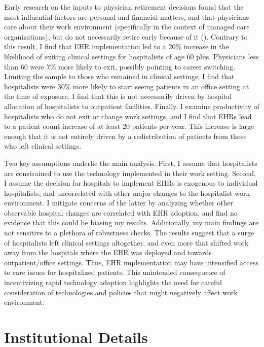 \documentclass[12pt]{article}
\begin{document}
Early research on the inputs to physician retirement decisions found that the most influential factors are personal and financial matters, and that physicians care about their work environment (specifically in the context of managed care organizations), but do not necessarily retire early because of it (\cite{Bahrami2002}). Contrary to this result, I find that EHR implementation led to a 20\% increase in the likelihood of exiting clinical settings for hospitalists of age 60 plus. Physicians less than 60 were 7\% more likely to exit, possibly pointing to career switching. Limiting the sample to those who remained in clinical settings, I find that hospitalists were 30\% more likely to start seeing patients in an office setting at the time of exposure. I find that this is not necessarily driven by hospital allocation of hospitalists to outpatient facilities. Finally, I examine productivity of hospitalists who do not exit or change work settings, and I find that EHRs lead to a patient count increase of at least 20 patients per year. This increase is large enough that it is not entirely driven by a redistribution of patients from those who left clinical settings. 

Two key assumptions underlie the main analysis. First, I assume that hospitalists are constrained to use the technology implemented in their work setting. Second, I assume the decision for hospitals to implement EHRs is exogenous to individual hospitalists, and uncorrelated with other major changes to the hospitalist work environment. I mitigate concerns of the latter by analyzing whether other observable hospital changes are correlated with EHR adoption, and find no evidence that this could be biasing my results. Additionally, my main findings are not sensitive to a plethora of robustness checks. The results suggest that a surge of hospitalists left clinical settings altogether, and even more that shifted work away from the hospitals where the EHR was deployed and towards outpatient/office settings. Thus, EHR implementation may have intensified access to care issues for hospitalized patients. This unintended consequence of incentivizing rapid technology adoption highlights the need for careful consideration of technologies and policies that might negatively affect work environment. 




\section{Institutional Details}
\end{document}
